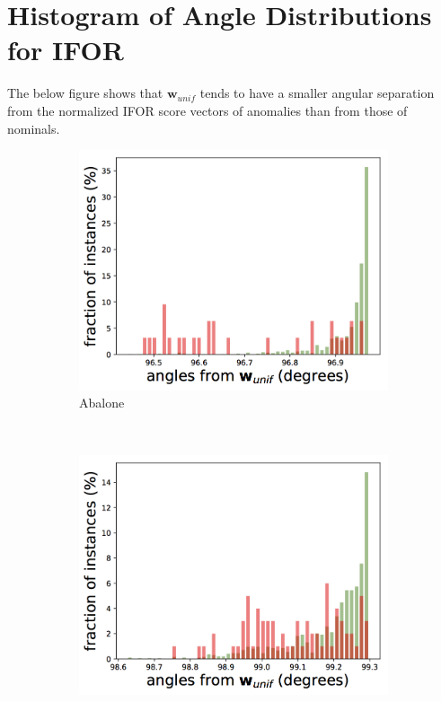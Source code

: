 \documentclass{article} %
\begin{document}
\section{Histogram of Angle Distributions for IFOR}
The below figure shows that ${\mathbf w}_{unif}$ tends to have a smaller angular separation from the normalized IFOR score vectors of anomalies than from those of nominals.
\begin{figure}[h]
	\centering
	\captionsetup{labelformat=empty}
	\begin{subfigure}[b]{0.23\textwidth}
		\includegraphics[width=\textwidth]{angles/angles_abalone_iforest.png}
		\caption{Abalone}
		\label{fig:angles_abalone}
	\end{subfigure}
	~
	\begin{subfigure}[b]{0.23\textwidth}
		\includegraphics[width=\textwidth]{angles/angles_ann_thyroid_1v3_iforest.png}

\end{subfigure}
\end{figure}
\end{document}
